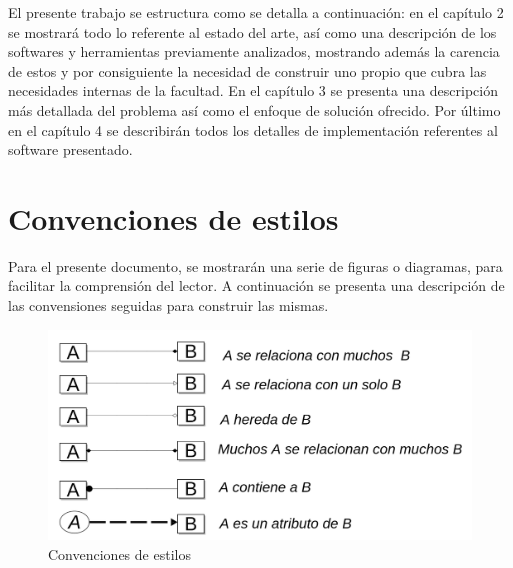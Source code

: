 El presente trabajo se estructura como se detalla a continuación: en el capítulo 2 se mostrará todo lo referente al estado del arte, así como una descripción de los softwares y herramientas previamente analizados, mostrando además la carencia de estos y por consiguiente la necesidad de construir uno propio que cubra las necesidades internas de la facultad. En el capítulo 3 se presenta una descripción más detallada del problema así como el enfoque de solución ofrecido. Por último en el capítulo 4 se describirán todos los detalles de implementación referentes al software presentado.
	
\section{Convenciones de estilos}
\label{sec:style_conventios}
	
Para el presente documento, se mostrarán una serie de figuras o diagramas, para facilitar la comprensión del lector. A continuación se presenta una descripción de las convensiones seguidas para construir las mismas.
	
\begin{figure}[h!]
	\centering
	\includegraphics[width=1\linewidth]{images/Introduction/style_conventions}
	\caption{Convenciones de estilos}
	\label{fig:style_conventions}
\end{figure}
	
	

